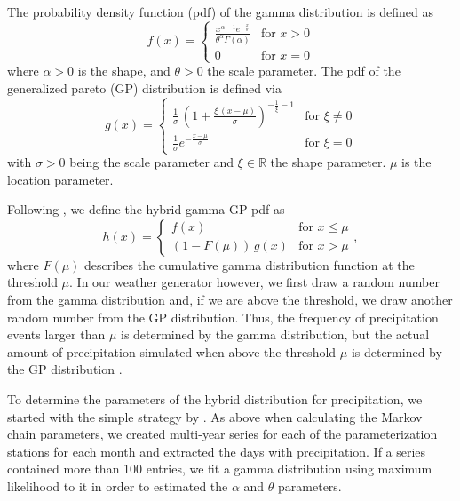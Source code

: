 \begin{refsection}
The probability density function (pdf) of the gamma distribution is defined as
\begin{equation}
f(x) = \begin{cases}
\frac{x^{\alpha - 1}e^{-\frac{x}{\theta}}}{\theta^{\alpha} \Gamma(\alpha)} & \text{for } x > 0 \\
0 & \text{for } x = 0
\end{cases} \label{eq:gamma}
\end{equation}
where $\alpha > 0$ is the shape, and $\theta > 0$ the scale parameter.
The pdf of the generalized pareto (GP) distribution is defined via
\begin{equation}
g(x) = \begin{cases}
\frac{1}{\sigma}\, \left( 1 + \frac{\xi\,\left(x - \mu\right)}{\sigma}\right)^{-\frac{1}{\xi} - 1} \label{eq:GP} & \text{for } \xi \neq 0 \\
\frac{1}{\sigma}e^{-\frac{x-\mu}{\sigma}} & \text{for } \xi = 0
\end{cases}
\end{equation}
with $\sigma > 0$ being the scale parameter and $\xi \in \mathbb{R}$ the shape parameter. $\mu$ is the location parameter.

Following \cite{FurrerKatz2008}, we define the hybrid gamma-GP pdf as
\begin{equation}
h(x) = \begin{cases}
f(x) & \text{for } x \leq \mu \\
(1 - F(\mu))\,g(x) & \text{for }  x > \mu
\end{cases}, \label{eq:GammaGP}
\end{equation}
where $F(\mu)$ describes the cumulative gamma distribution function at the threshold $\mu$. In our weather generator however, we first draw a random number from the gamma distribution and, if we are above the threshold, we draw another random number from the GP distribution. Thus, the frequency of precipitation events larger than $\mu$ is determined by the gamma distribution, but the actual amount of precipitation simulated when above the threshold $\mu$ is determined by the GP distribution \citep{FurrerKatz2008}.

To determine the parameters of the hybrid distribution for precipitation, we started with the simple strategy by \cite{GengDevriesSupit1986}. As above when calculating the Markov chain parameters, we created multi-year series for each of the parameterization stations for each month and extracted the days with precipitation. If a series contained more than 100 entries, we fit a gamma distribution using maximum likelihood to it in order to estimated the $\alpha$ and $\theta$ parameters.


\end{refsection}

